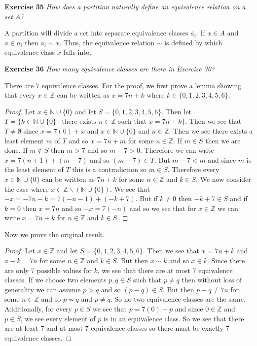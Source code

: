 \documentclass{article}
\begin{document}
\begin{flushleft}
\textbf{Exercise 35}
\textsl{How does a partition naturally define an equivalence relation on a set $A$?}\newline

A partition will divide a set into separate equivalence classes $\overline{a_i}$. If $x \in A$ and $x \in \overline{a_i}$ then $a_i \sim x$. Thus, the equivalence relation $\sim$ is defined by which equivalence class $x$ falls into.\newline

\textbf{Exercise 36}
\textsl{How many equivalence classes are there in Exercise 30?}\newline

There are $7$ equivalence classes. For the proof, we first prove a lemma showing that every $x \in \mathbb{Z}$ can be written as $x=7n+k$ where $k \in \{0,1,2,3,4,5,6\}$.

\begin{proof}
Let $x \in \mathbb{N} \cup \{0\}$ and let $S=\{0,1,2,3,4,5,6\}$. Then let $T=\{k \in \mathbb{N} \cup \{0\} \mid \text{there exists } n \in \mathbb{Z} \text{ such that } x = 7n+k\}$. Then we see that $T \neq \emptyset$ since $x = 7(0) + x$ and $x \in \mathbb{N} \cup \{0\}$ and $n \in \mathbb{Z}$. Then we see there exists a least element $m$ of $T$ and so $x=7n+m$ for some $n \in \mathbb{Z}$. If $m \in S$ then we are done. If $m \notin S$ then $m > 7$ and so $m - 7 > 0$. Therefore we can write $x=7(n+1)+(m-7)$ and so $(m-7) \in T$. But $m-7<m$ and since $m$ is the least element of $T$ this is a contradiction so $m \in S$. Therefore every $x \in \mathbb{N} \cup \{0\}$ can be written as $7n+k$ for some $n \in \mathbb{Z}$ and $k \in S$. We now consider the case where $x \in \mathbb{Z} \backslash (\mathbb{N} \cup \{0\})$. We see that $-x = -7n-k = 7(-n-1) + (-k+7)$. But if $k \neq 0$ then $-k+7 \in S$ and if $k=0$ then $x=7n$ and so $-x=7(-n)$ and so we see that for $x \in \mathbb{Z}$ we can write $x=7n+k$ for $n \in \mathbb{Z}$ and $k \in S$.
\end{proof}

Now we prove the original result.

\begin{proof}
Let $x \in \mathbb{Z}$ and let $S = \{0,1,2,3,4,5,6\}$. Then we see that $x = 7n+k$ and $x-k=7n$ for some $n \in \mathbb{Z}$ and $k \in S$. But then $x \sim k$ and so $x \in \overline{k}$. Since there are only $7$ possible values for $k$, we see that there are at most $7$ equivalence classes. If we choose two elements $p,q \in S$ such that $p \neq q$ then without loss of generality we can assume $p>q$ and so $(p-q) \in S$. But then $p-q \neq 7n$ for some $n \in \mathbb{Z}$ and so $p \nsim q$ and $\overline{p} \neq \overline{q}$. So no two equivalence classes are the same. Additionally, for every $p \in S$ we see that $p = 7(0) + p$ and since $0 \in \mathbb{Z}$ and $p \in S$, we see every element of $p$ is in an equivalence class. So we see that there are at least $7$ and at most $7$ equivalence classes so there must be exactly $7$ equivalence classes.
\end{proof}


\end{flushleft}
\end{document}
